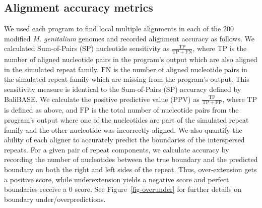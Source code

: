 \documentclass{llncs}
\begin{document}
\subsection{Alignment accuracy metrics}
\label{sec:metrics}
We used each program to find local multiple alignments in each of the
200 modified \emph{M. genitalium} genomes and recorded alignment
accuracy as follows. We calculated Sum-of-Pairs (SP) nucleotide sensitivity
as $\frac{\mathrm{TP}}{\mathrm{TP} + \mathrm{FN}}$, where
$\mathrm{TP}$ is the number of aligned nucleotide pairs in the
program's output which are also aligned in the simulated repeat
family.  $\mathrm{FN}$ is the number of aligned nucleotide pairs in
the simulated repeat family which are missing from the program's
output.  This sensitivity measure is identical to the Sum-of-Pairs (SP)
accuracy defined by BaliBASE\cite{ref-balibase}.  We calculate the
positive predictive value (PPV) as $\frac{\mathrm{TP}}{\mathrm{TP} +
\mathrm{FP}}$, where $\mathrm{TP}$ is defined as above, and
$\mathrm{FP}$ is the total number of nucleotide pairs from the
program's output where one of the nucleotides are part of the
simulated repeat family and the other nucleotide was incorrectly
aligned. We also quantify the ability of each aligner to accurately predict the
boundaries of the interspersed repeats.  For a given pair of repeat components, we calculate accuracy by recording the number of nucleotides between the true boundary and the predicted boundary
on both the right and left sides of the repeat.  Thus, over-extension gets a positive score, while underextension
yields a negative score and perfect boundaries receive a 0 score. See Figure~\ref{fig-overunder} for
further details on boundary under/overpredictions.
\end{document}
